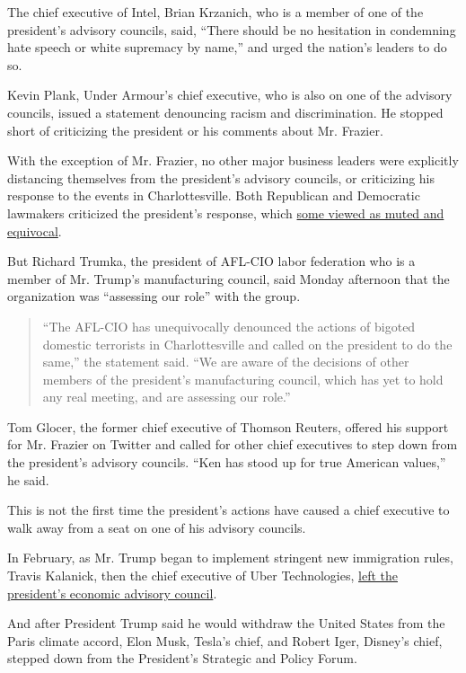 The chief executive of Intel, Brian Krzanich, who is a member of one of
the president's advisory councils, said, ``There should be no hesitation
in condemning hate speech or white supremacy by name,'' and urged the
nation's leaders to do so.

Kevin Plank, Under Armour's chief executive, who is also on one of the
advisory councils, issued a statement denouncing racism and
discrimination. He stopped short of criticizing the president or his
comments about Mr. Frazier.

With the exception of Mr. Frazier, no other major business leaders were
explicitly distancing themselves from the president's advisory councils,
or criticizing his response to the events in Charlottesville. Both
Republican and Democratic lawmakers criticized the president's response,
which
\href{https://www.nytimes.com/2017/08/12/us/trump-charlottesville-protest-nationalist-riot.html}{some
viewed as muted and equivocal}.

But Richard Trumka, the president of AFL-CIO labor federation who is a
member of Mr. Trump's manufacturing council, said Monday afternoon that
the organization was ``assessing our role'' with the group.

\begin{quote}
``The AFL-CIO has unequivocally denounced the actions of bigoted
domestic terrorists in Charlottesville and called on the president to do
the same,'' the statement said. ``We are aware of the decisions of other
members of the president's manufacturing council, which has yet to hold
any real meeting, and are assessing our role.''
\end{quote}

Tom Glocer, the former chief executive of Thomson Reuters, offered his
support for Mr. Frazier on Twitter and called for other chief executives
to step down from the president's advisory councils. ``Ken has stood up
for true American values,'' he said.

This is not the first time the president's actions have caused a chief
executive to walk away from a seat on one of his advisory councils.

In February, as Mr. Trump began to implement stringent new immigration
rules, Travis Kalanick, then the chief executive of Uber Technologies,
\href{https://www.nytimes.com/2017/02/02/technology/uber-ceo-travis-kalanick-trump-advisory-council.html?_r=0}{left
the president's economic advisory council}.

And after President Trump said he would withdraw the United States from
the Paris climate accord, Elon Musk, Tesla's chief, and Robert Iger,
Disney's chief, stepped down from the President's Strategic and Policy
Forum.

